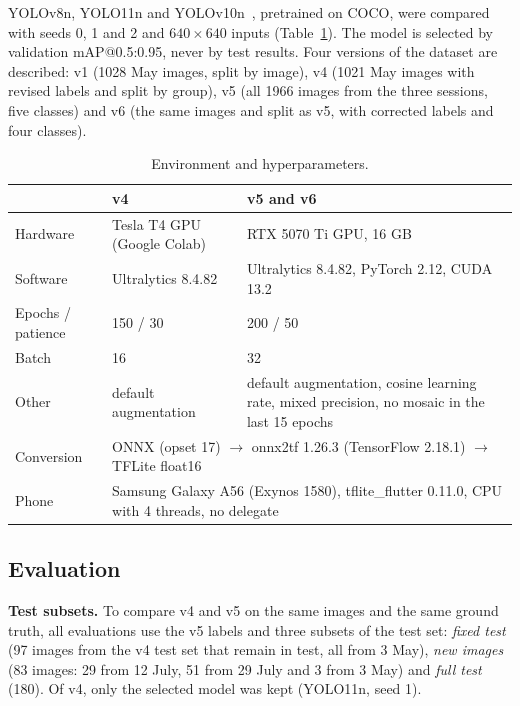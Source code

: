 \documentclass[sensors,article,submit,pdftex,moreauthors]{Definitions/mdpi}
\begin{document}
YOLOv8n, YOLO11n and YOLOv10n~\cite{Jocher2023,Jocher2024,Wang2024v10}, pretrained on COCO, were compared with seeds 0, 1 and 2 and $640\times640$ inputs (Table~\ref{tab:entorno}). The model is selected by validation mAP@0.5:0.95, never by test results. Four versions of the dataset are described: v1 (1028 May images, split by image), v4 (1021 May images with revised labels and split by group), v5 (all 1966 images from the three sessions, five classes) and v6 (the same images and split as v5, with corrected labels and four classes).

\begin{table}[H]
\caption{Environment and hyperparameters.\label{tab:entorno}}
\begin{tabularx}{\textwidth}{lXX}
\toprule
& \textbf{v4} & \textbf{v5 and v6}\\
\midrule
Hardware & Tesla T4 GPU (Google Colab) & RTX 5070 Ti GPU, 16 GB\\
Software & Ultralytics 8.4.82 & Ultralytics 8.4.82, PyTorch 2.12, CUDA 13.2\\
Epochs / patience & 150 / 30 & 200 / 50\\
Batch & 16 & 32\\
Other & default augmentation & default augmentation, cosine learning rate, mixed precision, no mosaic in the last 15 epochs\\
\midrule
Conversion & \multicolumn{2}{p{0.72\textwidth}}{ONNX (opset 17) $\rightarrow$ onnx2tf 1.26.3 (TensorFlow 2.18.1) $\rightarrow$ TFLite float16}\\
Phone & \multicolumn{2}{p{0.72\textwidth}}{Samsung Galaxy A56 (Exynos 1580), tflite\_flutter 0.11.0, CPU with 4 threads, no delegate}\\
\bottomrule
\end{tabularx}
\end{table}

\subsection{Evaluation}

\textbf{Test subsets.} To compare v4 and v5 on the same images and the same ground truth, all evaluations use the v5 labels and three subsets of the test set: \emph{fixed test} (97 images from the v4 test set that remain in test, all from 3 May), \emph{new images} (83 images: 29 from 12 July, 51 from 29 July and 3 from 3 May) and \emph{full test} (180). Of v4, only the selected model was kept (YOLO11n, seed 1).
\end{document}
